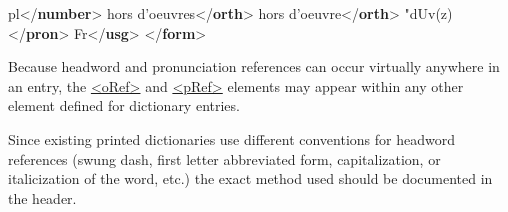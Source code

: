 \begin{shaded}
pl{</\textbf{number}>}\mbox{}\newline 
{}hors d'oeuvres{</\textbf{orth}>}\mbox{}\newline 
{}hors d'oeuvre{</\textbf{orth}>}\mbox{}\newline 
{}"dUv(z){</\textbf{pron}>}\mbox{}\newline 
{}\mbox{}\newline 
\hspace*{1em}Fr{</\textbf{usg}>}\mbox{}\newline 
\hspace*{1em}\mbox{}\newline 
\hspace*{1em}\hspace*{1em}\mbox{}\newline 
\hspace*{1em}\mbox{}\newline 
{}\mbox{}\newline 
{</\textbf{form}>}\end{shaded}\egroup\par \par
Because headword and pronunciation references can occur virtually anywhere in an entry, the \hyperref[TEI.oRef]{<oRef>} and \hyperref[TEI.pRef]{<pRef>} elements may appear within any other element defined for dictionary entries.\par
Since existing printed dictionaries use different conventions for headword references (swung dash, first letter abbreviated form, capitalization, or italicization of the word, etc.) the exact method used should be documented in the header.
